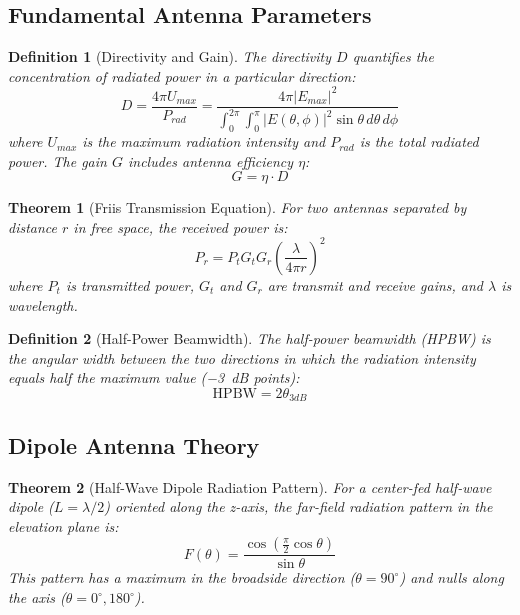\documentclass[a4paper, 11pt]{article}
\newtheorem{definition}{Definition}[section]
\newtheorem{theorem}{Theorem}[section]
\begin{document}
\subsection{Fundamental Antenna Parameters}

\begin{definition}[Directivity and Gain]
The directivity $D$ quantifies the concentration of radiated power in a particular direction:
\begin{equation}
D = \frac{4\pi U_{max}}{P_{rad}} = \frac{4\pi |E_{max}|^2}{\int_0^{2\pi}\int_0^{\pi} |E(\theta,\phi)|^2 \sin\theta \, d\theta \, d\phi}
\end{equation}
where $U_{max}$ is the maximum radiation intensity and $P_{rad}$ is the total radiated power. The gain $G$ includes antenna efficiency $\eta$:
\begin{equation}
G = \eta \cdot D
\end{equation}
\end{definition}

\begin{theorem}[Friis Transmission Equation]
For two antennas separated by distance $r$ in free space, the received power is:
\begin{equation}
P_r = P_t G_t G_r \left(\frac{\lambda}{4\pi r}\right)^2
\end{equation}
where $P_t$ is transmitted power, $G_t$ and $G_r$ are transmit and receive gains, and $\lambda$ is wavelength.
\end{theorem}

\begin{definition}[Half-Power Beamwidth]
The half-power beamwidth (HPBW) is the angular width between the two directions in which the radiation intensity equals half the maximum value (\SI{-3}{dB} points):
\begin{equation}
\text{HPBW} = 2\theta_{3dB}
\end{equation}
\end{definition}

\subsection{Dipole Antenna Theory}

\begin{theorem}[Half-Wave Dipole Radiation Pattern]
For a center-fed half-wave dipole ($L = \lambda/2$) oriented along the z-axis, the far-field radiation pattern in the elevation plane is:
\begin{equation}
F(\theta) = \frac{\cos\left(\frac{\pi}{2}\cos\theta\right)}{\sin\theta}
\end{equation}
This pattern has a maximum in the broadside direction ($\theta = 90^\circ$) and nulls along the axis ($\theta = 0^\circ, 180^\circ$).
\end{theorem}
\end{document}
